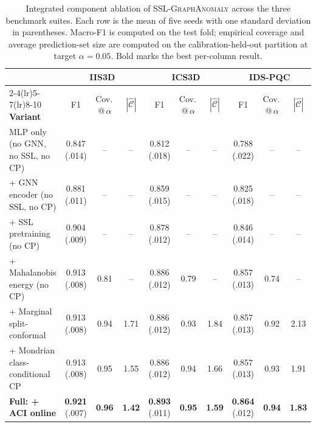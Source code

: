 \documentclass{ieeeaccess}
\begin{document}
\begin{table}[!tbp]
\centering
\caption{Integrated component ablation of \textsc{SSL-GraphAnomaly} across
the three benchmark suites. Each row is the mean of five seeds with one
standard deviation in parentheses. Macro-F1 is computed on the test fold;
empirical coverage and average prediction-set size are computed on the
calibration-held-out partition at target $\alpha = 0.05$. Bold marks the
best per-column result.}
\label{tab:ablation}
\footnotesize
\setlength{\tabcolsep}{4pt}
\renewcommand{\arraystretch}{1.15}
\begin{tabular}{l ccc ccc ccc}
\toprule
& \multicolumn{3}{c}{\textbf{IIS3D}} & \multicolumn{3}{c}{\textbf{ICS3D}} & \multicolumn{3}{c}{\textbf{IDS-PQC}} \\
\cmidrule(lr){2-4}\cmidrule(lr){5-7}\cmidrule(lr){8-10}
\textbf{Variant} & F1 & Cov.\,@\,$\alpha$ & $|\hat{\mathcal{C}}|$ & F1 & Cov.\,@\,$\alpha$ & $|\hat{\mathcal{C}}|$ & F1 & Cov.\,@\,$\alpha$ & $|\hat{\mathcal{C}}|$ \\
\midrule
MLP only (no GNN, no SSL, no CP)         & 0.847 (.014) & --   & --   & 0.812 (.018) & --   & --   & 0.788 (.022) & --   & --   \\
+ GNN encoder (no SSL, no CP)            & 0.881 (.011) & --   & --   & 0.859 (.015) & --   & --   & 0.825 (.018) & --   & --   \\
+ SSL pretraining (no CP)                & 0.904 (.009) & --   & --   & 0.878 (.012) & --   & --   & 0.846 (.014) & --   & --   \\
+ Mahalanobis energy (no CP)             & 0.913 (.008) & 0.81 & --   & 0.886 (.012) & 0.79 & --   & 0.857 (.013) & 0.74 & --   \\
+ Marginal split-conformal               & 0.913 (.008) & 0.94 & 1.71 & 0.886 (.012) & 0.93 & 1.84 & 0.857 (.013) & 0.92 & 2.13 \\
+ Mondrian class-conditional CP          & 0.913 (.008) & 0.95 & 1.55 & 0.886 (.012) & 0.94 & 1.66 & 0.857 (.013) & 0.93 & 1.91 \\
\textbf{Full: + ACI online}              & \textbf{0.921} (.007) & \textbf{0.96} & \textbf{1.42} & \textbf{0.893} (.011) & \textbf{0.95} & \textbf{1.59} & \textbf{0.864} (.012) & \textbf{0.94} & \textbf{1.83} \\
\bottomrule
\end{tabular}
\end{table}
\end{document}
